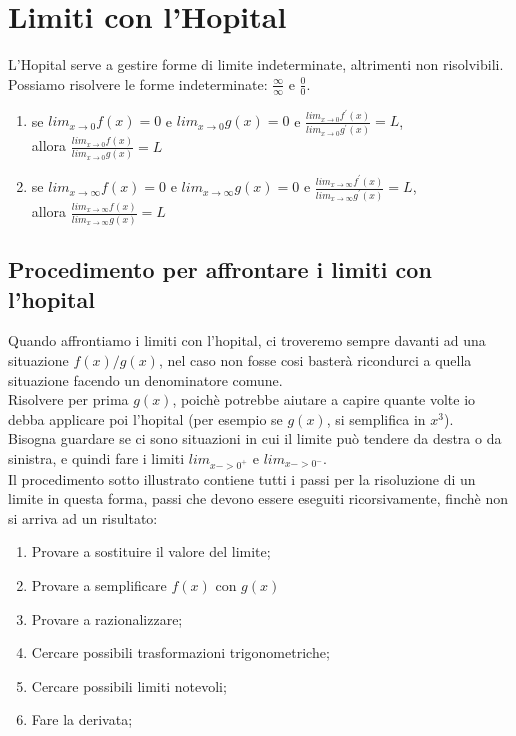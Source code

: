 \documentclass[11pt]{article}
\begin{document}
\section{Limiti con l'Hopital}
L'Hopital serve a gestire forme di limite indeterminate, altrimenti non risolvibili.\\
Possiamo risolvere le forme indeterminate: $\frac{\infty}{\infty}$ e $\frac{0}{0}$.\\
\begin{enumerate}
    \item se $lim_{x \rightarrow 0}f(x) = 0$ e $lim_{x \rightarrow 0}g(x) = 0$ e 
    $\frac{lim_{x \rightarrow 0}f^{'}(x)}{lim_{x \rightarrow 0}g^{'}(x)} = L$,\\ allora 
    $\frac{lim_{x \rightarrow 0}f(x)}{lim_{x \rightarrow 0}g(x)} = L$
    \item se $lim_{x \rightarrow \infty}f(x) = 0$ e $lim_{x \rightarrow \infty}g(x) = 0$ e 
    $\frac{lim_{x \rightarrow \infty}f^{'}(x)}{lim_{x \rightarrow \infty}g^{'}(x)} = L$,\\ allora 
    $\frac{lim_{x \rightarrow \infty}f(x)}{lim_{x \rightarrow \infty}g(x)} = L$
\end{enumerate}

\subsection{Procedimento per affrontare i limiti con l'hopital}
Quando affrontiamo i limiti con l'hopital, ci troveremo sempre davanti ad una situazione 
$f(x)/g(x)$, nel caso non fosse cosi basterà ricondurci a quella situazione facendo un 
denominatore comune.\\
Risolvere per prima $g(x)$, poichè potrebbe aiutare a capire quante volte io debba applicare poi 
l'hopital (per esempio se $g(x)$, si semplifica in $x^{3}$).\\
Bisogna guardare se ci sono situazioni in cui il limite può tendere da destra o da sinistra, 
e quindi fare i limiti $lim_{x->0^{+}}$ e $lim_{x->0^{-}}$.\\
Il procedimento sotto illustrato contiene tutti i passi per la risoluzione di un limite in questa 
forma, passi che devono essere eseguiti ricorsivamente, finchè non si arriva ad un risultato:\\
\begin{enumerate}
    \item Provare a sostituire il valore del limite;
    \item Provare a semplificare $f(x)$ con $g(x)$
    \item Provare a razionalizzare;
    \item Cercare possibili trasformazioni trigonometriche;
    \item Cercare possibili limiti notevoli;
    \item Fare la derivata;
\end{enumerate}
\end{document}
